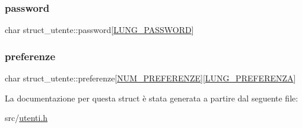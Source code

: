 \subsubsection{\texorpdfstring{password}{password}}
{\footnotesize\ttfamily char struct\+\_\+utente\+::password\mbox{[}\hyperlink{utenti_8h_ad21198b3cb8d2fe2c3d8fb67746bf172}{L\+U\+N\+G\+\_\+\+P\+A\+S\+S\+W\+O\+RD}\mbox{]}}

\mbox{\label{structstruct__utente_aa4baca77ad55655cb4fe134c6074e6a7}} 
\subsubsection{\texorpdfstring{preferenze}{preferenze}}
{\footnotesize\ttfamily char struct\+\_\+utente\+::preferenze\mbox{[}\hyperlink{utenti_8h_afd3f4e6f098069fc2af012d2e454443a}{N\+U\+M\+\_\+\+P\+R\+E\+F\+E\+R\+E\+N\+ZE}\mbox{]}\mbox{[}\hyperlink{utenti_8h_a0fd5baff776b4f5be964c2f6383f415a}{L\+U\+N\+G\+\_\+\+P\+R\+E\+F\+E\+R\+E\+N\+ZA}\mbox{]}}



La documentazione per questa struct è stata generata a partire dal seguente file\+:\begin{DoxyCompactItemize}
\item 
src/\hyperlink{utenti_8h}{utenti.\+h}\end{DoxyCompactItemize}
